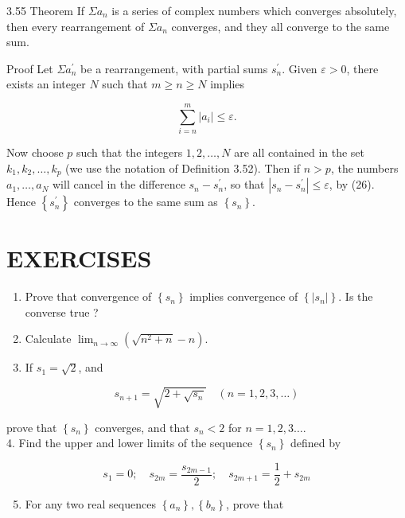 \documentclass[10pt]{article}
\begin{document}
3.55 Theorem If $\Sigma a_{n}$ is a series of complex numbers which converges absolutely, then every rearrangement of $\Sigma a_{n}$ converges, and they all converge to the same sum.

Proof Let $\Sigma a_{n}^{\prime}$ be a rearrangement, with partial sums $s_{n}^{\prime}$. Given $\varepsilon>0$, there exists an integer $N$ such that $m \geq n \geq N$ implies


\begin{equation*}
\sum_{i=n}^{m}\left|a_{i}\right| \leq \varepsilon . \tag{26}
\end{equation*}


Now choose $p$ such that the integers $1,2, \ldots, N$ are all contained in the set $k_{1}, k_{2}, \ldots, k_{p}$ (we use the notation of Definition 3.52). Then if $n>p$, the numbers $a_{1}, \ldots, a_{N}$ will cancel in the difference $s_{n}-s_{n}^{\prime}$, so that $\left|s_{n}-s_{n}^{\prime}\right| \leq \varepsilon$, by (26). Hence $\left\{s_{n}^{\prime}\right\}$ converges to the same sum as $\left\{s_{n}\right\}$.

\section*{EXERCISES}
\begin{enumerate}
  \item Prove that convergence of $\left\{s_{n}\right\}$ implies convergence of $\left\{\left|s_{n}\right|\right\}$. Is the converse true ?
  \item Calculate $\lim _{n \rightarrow \infty}\left(\sqrt{n^{2}+n}-n\right)$.
  \item If $s_{1}=\sqrt{2}$, and
\end{enumerate}

$$
s_{n+1}=\sqrt{2+\sqrt{s_{n}}} \quad(n=1,2,3, \ldots)
$$

prove that $\left\{s_{n}\right\}$ converges, and that $s_{n}<2$ for $n=1,2,3 \ldots$.\\
4. Find the upper and lower limits of the sequence $\left\{s_{n}\right\}$ defined by

$$
s_{1}=0 ; \quad s_{2 m}=\frac{s_{2 m-1}}{2} ; \quad s_{2 m+1}=\frac{1}{2}+s_{2 m}
$$

\begin{enumerate}
  \setcounter{enumi}{4}
  \item For any two real sequences $\left\{a_{n}\right\},\left\{b_{n}\right\}$, prove that
\end{enumerate}
\end{document}

